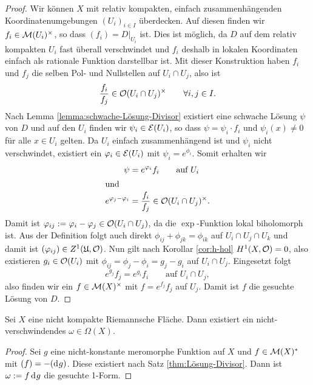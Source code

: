 \begin{proof}
  Wir können $X$ mit relativ kompakten, einfach zusammenhängenden
  Koordinatenumgebungen $(U_i)_{i \in I}$ überdecken. Auf diesen
  finden wir $f_i \in \mathcal{M}(U_i)^\times$, so dass $(f_i) =
  D|_{U_i}$ ist. Dies ist möglich, da $D$ auf dem relativ kompakten $U_i$
  fast überall verschwindet und $f_i$ deshalb in lokalen Koordinaten
  einfach als rationale Funktion darstellbar ist. 
  Mit dieser Konstruktion haben $f_i$ und $f_j$ die selben Pol- und
  Nullstellen auf $U_i \cap U_j$, also ist
  \[
  \frac{f_i}{f_j} \in \mathcal{O}(U_i \cap U_j)^\times \qquad \forall i,j \in I.
  \]
  Nach Lemma \ref{lemma:schwache-Lösung-Divisor} existiert eine
  schwache Lösung $\psi$ von $D$ und auf den $U_i$ finden wir $\psi_i
  \in \mathcal{E}(U_i)$, so dass $\psi = \psi_i \cdot f_i$ und $\psi_i(x)
  \neq 0$ für alle $x \in U_i$ gelten. 
  Da $U_i$ einfach zusammenhängend ist und $\psi_i$ nicht
  verschwindet, existiert ein $\varphi_i \in \mathcal{E}(U_i)$ mit $\psi_i =
  e^{\phi_i}$. Somit erhalten wir
  \begin{align*}
  \psi & = e^{\varphi_i} f_i \qquad \text{auf } U_i \\
  \intertext{und}
  e^{\varphi_j - \varphi_i} & = \frac{f_i}{f_j} \in \mathcal{O}(U_i \cap U_j)^\times.
  \end{align*}
  Damit ist $\varphi_{ij} := \varphi_i - \varphi_j \in \mathcal{O}(U_i \cap U_j)$, da
  die $\exp$-Funktion lokal biholomorph ist. Aus der Definition folgt
  auch direkt $\phi_{ij} + \phi_{jk} = \phi_{ik}$ auf $U_i \cap U_j
  \cap U_k$ und damit ist $(\varphi_{ij}) \in Z^1(\mathfrak{U}, \mathcal{O})$. 
  Nun gilt nach Korollar \ref{cor:h-hol} $H^1(X, \mathcal{O}) = 0$, also existieren $g_i \in \mathcal{O}(U_i)$ mit
  $\phi_{ij} = \phi_j - \phi_i = g_j - g_i$ auf $U_i \cap U_j$.
  Eingesetzt folgt
  \[
  e^{g_j} f_j = e^{g_i} f_i \qquad \text{auf } U_i \cap U_j,
  \]
  also finden wir ein $f \in \mathcal{M}(X)^\times$ mit $f = e^{f_j} f_j$ auf
  $U_j$. Damit ist $f$ die gesuchte Lösung von $D$.
\end{proof}

\begin{cor}
  \label{cor:nicht-verschwindende-1-form}
  Sei $X$ eine nicht kompakte Riemannsche Fläche. 
  Dann existiert ein nicht-verschwindendes $\omega \in \Omega(X)$.
\end{cor}

\begin{proof}
  Sei $g$ eine nicht-konstante meromorphe Funktion auf $X$ und $f \in
  \mathcal{M}(X)^\ast$ mit $(f) = -(\d[g])$. Diese existiert nach Satz
  \ref{thm:Lösung-Divisor}. Dann ist $\omega := f \d[g]$ die gesuchte 1-Form.
\end{proof}


